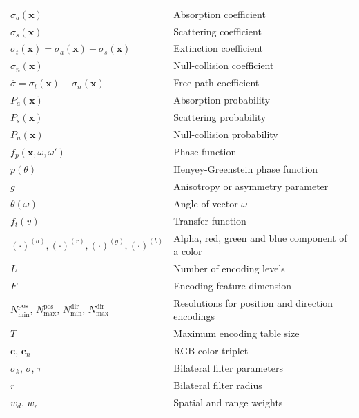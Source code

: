 \begin{table}[p]
\begin{tabular}{ll}
        \hline         
        $\sigma_a(\mathbf{x})$          & Absorption coefficient \\ 
        $\sigma_s(\mathbf{x})$          & Scattering coefficient \\ 
        $\sigma_t(\mathbf{x}) = \sigma_a(\mathbf{x}) + \sigma_s(\mathbf{x})$
                                        & Extinction coefficient \\ 
        $\sigma_n(\mathbf{x})$          & Null-collision coefficient \\ 
        $\overline\sigma = \sigma_t(\mathbf{x}) + \sigma_n(\mathbf{x})$
                                        & Free-path coefficient \\
        \hline
        $P_a(\mathbf{x})$               & Absorption probability \\
        $P_s(\mathbf{x})$               & Scattering probability \\
        $P_n(\mathbf{x})$               & Null-collision probability \\
        \hline
        $f_p(\mathbf{x}, \omega, \omega')$
                                        & Phase function \\
        $p(\theta)$                     & Henyey-Greenstein phase function \\
        $g$                             & Anisotropy or asymmetry parameter \\ 
        $\theta(\omega)$                & Angle of vector $\omega$ \\
        $f_t(v)$                        & Transfer function \\
        $(\cdot)^{(a)}, (\cdot)^{(r)}, (\cdot)^{(g)}, (\cdot)^{(b)}$
            & Alpha, red, green and blue component of a color \\
        \hline
        $L$                             & Number of encoding levels \\
        $F$                             & Encoding feature dimension \\
        $N_{\min}^{\text{pos}}$, $N_{\max}^{\text{pos}}$,
        $N_{\min}^{\text{dir}}$, $N_{\max}^{\text{dir}}$
                                        & Resolutions for
                                          position and direction encodings \\
        $T$                             & Maximum encoding table size \\
        \hline
        $\mathbf{c}$, $\mathbf{c}_n$    & RGB color triplet \\
        $\sigma_k$, $\sigma$, $\tau$    & Bilateral filter parameters \\
        $r$                             & Bilateral filter radius \\
        $w_d$, $w_r$                    & Spatial and range weights \\
    \end{tabular}
\end{table}

